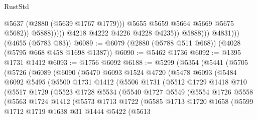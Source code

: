 \begin{lexlean}{RustStd}
\begin{coremodule}
                                    @5637
                                    (@2880 (@5639 @1767 @1779)))
                                  @5655
                                  @5659
                                  @5664
                                  @5669
                                  @5675
                                  @5682))
                              @5888)))))
                    @4218
                    @4222
                    @4226
                    @4228
                    @4235))
                @5888)))
          @4831)))
    (@4655 (@5783 @83))
@6089 := @6079 (@2880 (@5788 @511 @668)) (@4028 (@5795 @668 @458 @1698 @1387))
@6090 := @5462 @1736
@6092 := @1395 @1731 @1412
@6093 := @1756 @6092
@6188 := @5299
    (@5354
      (@5441
        (@5705
          (@5726
            (@6089
              (@6090
                (@5470
                  @6093
                  @1524
                  @4720
                  (@5478
                    @6093
                    (@5484
                      @6092
                      @5495
                      (@5500
                        @1731
                        @1412
                        (@5506
                          @1731
                          (@5512
                            @1729
                            @1418
                            @710
                            (@5517
                              @1729
                              (@5523
                                @1728
                                @5534
                                (@5540
                                  @1727
                                  @5549
                                  (@5554
                                    @1726
                                    @5558
                                    (@5563
                                      @1724
                                      @1412
                                      (@5573
                                        @1713
                                        @1722
                                        (@5585
                                          @1713
                                          @1720
                                          @1658
                                          (@5599
                                            @1712
                                            @1719
                                            @1638
                                            @31
                                            @1444
                                            @5422
                                            (@5613

\end{coremodule}
\end{lexlean}

